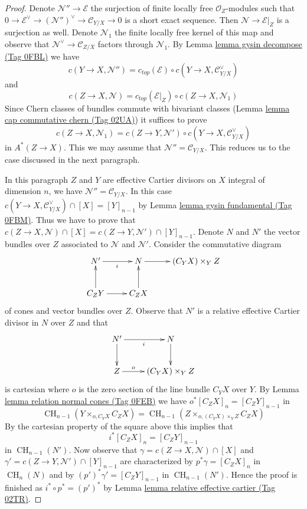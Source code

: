 \documentclass{amsart}
\theoremstyle{plain}
\theoremstyle{definition}
\theoremstyle{remark}
\numberwithin{equation}{subsection}
\def\CH{\mathop{\mathrm{CH}}\nolimits}
\begin{document}
\begin{proof}
\medskip\noindent
Denote $\mathcal{N}'' \to \mathcal{E}$ the surjection of finite locally
free $\mathcal{O}_Z$-modules such that
$0 \to \mathcal{E}^\vee \to (\mathcal{N}'')^\vee \to \mathcal{C}_{Y/X} \to 0$
is a short exact sequence. Then $\mathcal{N} \to \mathcal{E}|_Z$
is a surjection as well. Denote $\mathcal{N}_1$ the finite locally free kernel
of this map and observe that $\mathcal{N}^\vee \to \mathcal{C}_{Z/X}$
factors through $\mathcal{N}_1$.
By Lemma \href{https://stacks.math.columbia.edu/tag/0FBL}{lemma gysin decompose (Tag 0FBL)} we have
$$
c(Y \to X, \mathcal{N}'') = c_{top}(\mathcal{E}) \circ
c(Y \to X, \mathcal{C}_{Y/X}^\vee)
$$
and
$$
c(Z \to X, \mathcal{N}) = c_{top}(\mathcal{E}|_Z) \circ
c(Z \to X, \mathcal{N}_1)
$$
Since Chern classes of bundles commute with bivariant classes
(Lemma \href{https://stacks.math.columbia.edu/tag/02UA}{lemma cap commutative chern (Tag 02UA)})
it suffices to prove
$$
c(Z \to X, \mathcal{N}_1) =
c(Z \to Y, \mathcal{N}') \circ c(Y \to X, \mathcal{C}_{Y/X}^\vee)
$$
in $A^*(Z \to X)$. This we may assume that $\mathcal{N}'' = \mathcal{C}_{Y/X}$.
This reduces us to the case discussed in the next paragraph.

\medskip\noindent
In this paragraph $Z$ and $Y$ are effective Cartier divisors on $X$
integral of dimension $n$, we have $\mathcal{N}'' = \mathcal{C}_{Y/X}$.
In this case $c(Y \to X, \mathcal{C}_{Y/X}^\vee) \cap [X] = [Y]_{n - 1}$ by
Lemma \href{https://stacks.math.columbia.edu/tag/0FBM}{lemma gysin fundamental (Tag 0FBM)}. Thus we have to prove that
$c(Z \to X, \mathcal{N}) \cap [X] = c(Z \to Y, \mathcal{N}') \cap [Y]_{n - 1}$.
Denote $N$ and $N'$ the vector bundles over $Z$ associated to
$\mathcal{N}$ and $\mathcal{N}'$. Consider the commutative diagram
$$
\xymatrix{
N' \ar[r]_i &
N \ar[r] &
(C_Y X) \times_Y Z \\
C_Z Y \ar[r] \ar[u] &
C_Z X \ar[u]
}
$$
of cones and vector bundles over $Z$. Observe that $N'$ is a relative
effective Cartier divisor in $N$ over $Z$ and that
$$
\xymatrix{
N' \ar[d] \ar[r]_i & N \ar[d] \\
Z \ar[r]^-o & (C_Y X) \times_Y Z
}
$$
is cartesian where $o$ is the zero section of the line bundle
$C_Y X$ over $Y$. By
Lemma \href{https://stacks.math.columbia.edu/tag/0FEB}{lemma relation normal cones (Tag 0FEB)} we have $o^*[C_ZX]_n = [C_Z Y]_{n - 1}$
in
$$
\CH_{n - 1}(Y \times_{o, C_Y X} C_ZX) =
\CH_{n - 1}(Z \times_{o, (C_Y X) \times_Y Z} C_ZX)
$$
By the cartesian property of
the square above this implies that
$$
i^*[C_ZX]_n = [C_Z Y]_{n - 1}
$$
in $\CH_{n - 1}(N')$. Now observe that
$\gamma = c(Z \to X, \mathcal{N}) \cap [X]$ and
$\gamma' = c(Z \to Y, \mathcal{N}') \cap [Y]_{n - 1}$
are characterized by $p^*\gamma = [C_Z X]_n$ in $\CH_n(N)$
and by $(p')^*\gamma' = [C_Z Y]_{n - 1}$ in $\CH_{n - 1}(N')$.
Hence the proof is finished as $i^* \circ p^* = (p')^*$ by
Lemma \href{https://stacks.math.columbia.edu/tag/02TR}{lemma relative effective cartier (Tag 02TR)}.
\end{proof}
\end{document}
